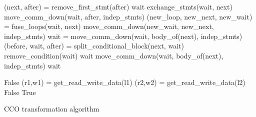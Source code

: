 \begin{algorithm}
{\begin{algorithmic}
  \State (next, after) = remove\_first\_stmt(after)
    \State \Return wait
    \State exchange\_stmts(wait, next)
    \State \Return move\_comm\_down(wait, after, indep\_stmts)
    \State (new\_loop, new\_next, new\_wait) = fuse\_loops(wait, next)
    \State \Return move\_comm\_down(new\_wait, new\_next, indep\_stmts)
    \State wait = move\_comm\_down(wait, body\_of(next), indep\_stmts)
      \State (before, wait, after) = split\_conditional\_block(next, wait)
      \State remove\_condition(wait)
    \EndIf
    \State \Return wait
    \State \Return move\_comm\_down(wait, body\_of(next), indep\_stmts)
  \Else
    \State \Return wait
  \EndIf
\EndFunction

    \State \Return False
  \EndIf
  \State (r1,w1) = get\_read\_write\_data(l1)
  \State (r2,w2) = get\_read\_write\_data(l2)
    \State \Return False
  \EndIf
  \State \Return True
\EndFunction

\end{algorithmic}
\caption{CCO transformation algorithm}
\label{alg:cco}
}%
\end{algorithm}


%
%
%
%

